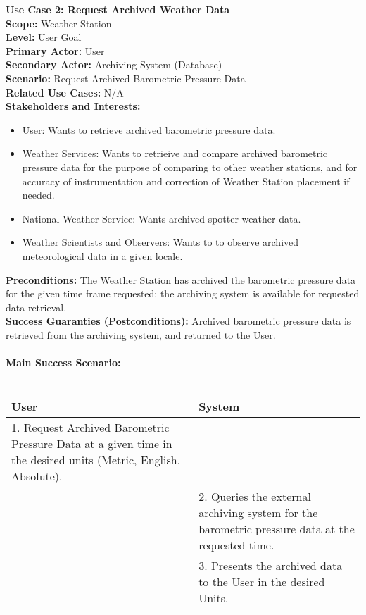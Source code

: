 \documentclass[letterpaper]{article}
\begin{document}
\noindent
\textbf{Use Case 2:  Request Archived Weather Data}\\
\textbf{Scope:  }Weather Station\\
\textbf{Level:  }User Goal\\
\textbf{Primary Actor:  }User\\
\textbf{Secondary Actor:  }Archiving System (Database)\\
\textbf{Scenario:  }Request Archived Barometric Pressure Data\\
\textbf{Related Use Cases:  }N/A\\
\textbf{Stakeholders and Interests:  }
\begin{itemize}
\item User:  Wants to retrieve archived barometric pressure data.
\item Weather Services:  Wants to retrieive and compare archived
barometric pressure data for the purpose of comparing to other weather
stations, and for accuracy of instrumentation and correction of
Weather Station placement if needed.
\item National Weather Service:  Wants archived spotter weather data.
\item Weather Scientists and Observers:  Wants to to observe archived
meteorological data in a given locale.
\end{itemize}
\textbf{Preconditions:  }The Weather Station has archived the
barometric pressure data for the given time frame requested; the
archiving system is available for requested data retrieval.\\
\textbf{Success Guaranties (Postconditions):  }Archived barometric
pressure
data is retrieved from the archiving system, and returned to the
User.\\\\
\textbf{Main Success Scenario:  }\\\\
\begin{tabular}{|p{6cm}|p{6cm}|}\hline
\textbf{User} & \textbf{System}\\\hline
1. Request Archived Barometric Pressure Data at a given time in the
desired units (Metric, English, Absolute).&\\\hline
&2.  Queries the external archiving system for the barometric pressure
data at the requested time.\\\hline
&3.  Presents the archived data to the User in the desired
Units.\\\hline
\end{tabular}\\\\
\end{document}
